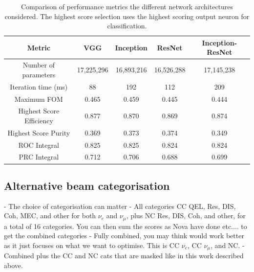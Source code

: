 \begin{table}
    \begin{tabular}{ccccc}
        Metric                   & VGG        & Inception  & ResNet     & Inception-ResNet \\
        \midrule
        Number of parameters     & 17,225,296 & 16,893,216 & 16,526,288 & 17,145,238       \\
        Iteration time (ms)      & 88         & 192        & 112        & 209              \\
        Maximum FOM              & 0.465      & 0.459      & 0.445      & 0.444            \\
        Highest Score Efficiency & 0.877      & 0.870      & 0.869      & 0.874            \\
        Highest Score Purity     & 0.369      & 0.373      & 0.374      & 0.349            \\
        ROC Integral             & 0.825      & 0.825      & 0.824      & 0.824            \\
        PRC Integral             & 0.712      & 0.706      & 0.688      & 0.699            \\
    \end{tabular}
    \caption[Comparison of performance metrics for the different network architectures considered.]
    {Comparison of performance metrics the different network architectures considered. The highest
        score selection uses the highest scoring output neuron for classification.}
    \label{tab:arch}
\end{table}

\subsection{Alternative beam categorisation} %
\label{sec:results_alt_cat} %

- The choice of categorisation can matter
- All categories CC QEL, Res, DIS, Coh, MEC, and other for both $\nu_{e}$ and $\nu_{\mu}$, plus NC
Res, DIS, Coh, and other, for a total of 16 categories. You can then sum the scores as Nova have
done etc.... to get the combined categories
- Fully combined, you may think would work better as it just focuses on what we want to optimise.
This is CC $\nu_{e}$, CC $\nu_{\mu}$, and NC.
- Combined plus the CC and NC cats that are masked like in this work described above.

